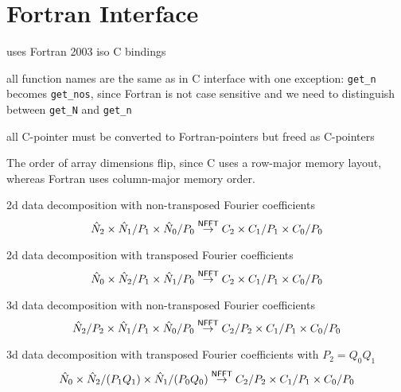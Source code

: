 \chapter{Fortran Interface}

\begin{compactitem}
  \item uses Fortran 2003 iso C bindings
  \item all function names are the same as in C interface with one exception: \verb+get_n+ becomes \verb+get_nos+,
        since Fortran is not case sensitive and we need to distinguish between \verb+get_N+ and \verb+get_n+
  \item all C-pointer must be converted to Fortran-pointers but freed as C-pointers
\end{compactitem}


The order of array dimensions flip, since C uses a row-major memory layout, whereas Fortran uses column-major memory order.


2d data decomposition with non-transposed Fourier coefficients
\begin{equation*}
  \hat N_2 \times \hat N_1 / P_1 \times \hat N_0 / P_0
  \overset{\textsf{\textsf{NFFT}}}{\rightarrow}
  C_2 \times C_1 / P_1 \times C_0 / P_0
\end{equation*}

2d data decomposition with transposed Fourier coefficients
\begin{equation*}
  \hat N_0 \times \hat N_2 / P_1 \times \hat N_1 / P_0
  \overset{\textsf{\textsf{NFFT}}}{\rightarrow}
  C_2 \times C_1 / P_1 \times C_0 / P_0
\end{equation*}

3d data decomposition with non-transposed Fourier coefficients
\begin{equation*}
  \hat N_2 / P_2 \times \hat N_1 / P_1 \times \hat N_0 / P_0
  \overset{\textsf{\textsf{NFFT}}}{\rightarrow}
  C_2 / P_2 \times C_1 / P_1 \times C_0 / P_0
\end{equation*}

3d data decomposition with transposed Fourier coefficients with $P_2 = Q_0 Q_1$
\begin{equation*}
  \hat N_0 \times \hat N_2 / (P_1 Q_1) \times \hat N_1 / (P_0 Q_0)
  \overset{\textsf{\textsf{NFFT}}}{\rightarrow}
  C_2 / P_2 \times C_1 / P_1 \times C_0 / P_0
\end{equation*}


